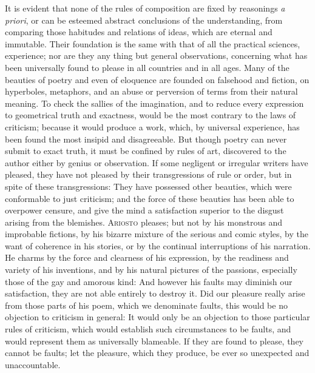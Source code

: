 It is evident that none of the rules of composition are fixed by
reasonings \textit{a priori}, or can be esteemed abstract conclusions
of the understanding, from comparing those habitudes and relations of
ideas, which are eternal and immutable. Their foundation is the same
with that of all the practical sciences, experience; nor are they any
thing but general observations, concerning what has been universally
found to please in all countries and in all ages. Many of the beauties
of poetry and even of eloquence are founded on falsehood and fiction,
on hyperboles, metaphors, and an abuse or perversion of terms from
their natural meaning. To check the sallies of the imagination, and to
reduce every expression to  geometrical truth and exactness,
would be the most contrary to the laws of criticism; because it would
produce a work, which, by universal experience, has been found the
most insipid and disagreeable. But though poetry can never submit to
exact truth, it must be confined by rules of art, discovered to the
author either by genius or observation. If some negligent or irregular
writers have pleased, they have not pleased by their transgressions of
rule or order, but in spite of these transgressions: They have
possessed other beauties, which were conformable to just criticism;
and the force of these beauties has been able to overpower censure,
and give the mind a satisfaction superior to the disgust arising from
the blemishes. \textsc{Ariosto} pleases; but not by his monstrous and
improbable fictions, by his bizarre mixture of the serious and comic
styles, by the want of coherence in his stories, or by the continual
interruptions of his narration. He charms by the force and clearness
of his expression, by the readiness and variety of his inventions, and
by his natural pictures of the passions, especially those of the gay
and amorous kind: And however his faults may diminish our
satisfaction, they are not able entirely to destroy it. Did our
pleasure really arise from those parts of his poem, which we
denominate faults, this would be no objection to criticism in general:
It would only be an objection to those particular rules of criticism,
which would establish such circumstances to be faults, and would
represent them as universally blameable. If they are found to please,
they cannot be faults; let the pleasure, which they produce, be ever
so unexpected and unaccountable.


